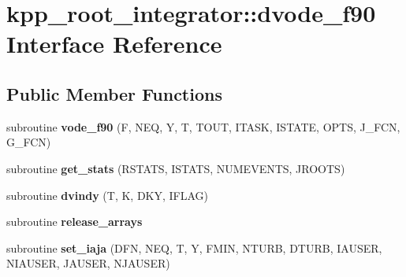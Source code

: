 \hypertarget{interfacekpp__root__integrator_1_1dvode__f90}{}\section{kpp\+\_\+root\+\_\+integrator\+:\+:dvode\+\_\+f90 Interface Reference}
\label{interfacekpp__root__integrator_1_1dvode__f90}
\subsection*{Public Member Functions}
\begin{DoxyCompactItemize}
\item 
\mbox{\label{interfacekpp__root__integrator_1_1dvode__f90_a8861b7452ea0cd7444e187287db271f2}} 
subroutine {\bfseries vode\+\_\+f90} (F, N\+EQ, Y, T, T\+O\+UT, I\+T\+A\+SK, I\+S\+T\+A\+TE, O\+P\+TS, J\+\_\+\+F\+CN, G\+\_\+\+F\+CN)
\item 
\mbox{\label{interfacekpp__root__integrator_1_1dvode__f90_a7f2adaf32f699d58af90ba0b38bdaa69}} 
subroutine {\bfseries get\+\_\+stats} (R\+S\+T\+A\+TS, I\+S\+T\+A\+TS, N\+U\+M\+E\+V\+E\+N\+TS, J\+R\+O\+O\+TS)
\item 
\mbox{\label{interfacekpp__root__integrator_1_1dvode__f90_abd01c7aab6576d5eef61cef406fb7d01}} 
subroutine {\bfseries dvindy} (T, K, D\+KY, I\+F\+L\+AG)
\item 
\mbox{\label{interfacekpp__root__integrator_1_1dvode__f90_ac848ac1df16bdedca248be90f2743f43}} 
subroutine {\bfseries release\+\_\+arrays}
\item 
\mbox{\label{interfacekpp__root__integrator_1_1dvode__f90_ab0e5bdf419633959be0923f4f09bc7e5}} 
subroutine {\bfseries set\+\_\+iaja} (D\+FN, N\+EQ, T, Y, F\+M\+IN, N\+T\+U\+RB, D\+T\+U\+RB, I\+A\+U\+S\+ER, N\+I\+A\+U\+S\+ER, J\+A\+U\+S\+ER, N\+J\+A\+U\+S\+ER)
\item 
\mbox{\label{interfacekpp__root__integrator_1_1dvode__f90_a9a222f417435c4fd0883f1832e5b48f5}} 

\end{DoxyCompactItemize}
